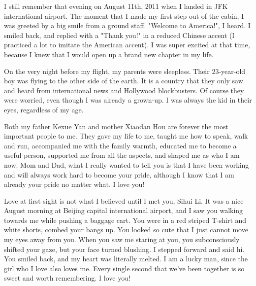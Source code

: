  
I still remember that evening on August 11th, 2011 when I landed in JFK international airport. The moment that I made my first step out of the cabin, I was greeted by a big smile from a ground staff. "Welcome to America!", I heard. I smiled back, and replied with a "Thank you!" in a reduced Chinese accent (I practiced a lot to imitate the American accent). I was super excited at that time, because I knew that I would open up a brand new chapter in my life. 

On the very night before my flight, my parents were sleepless. Their 23-year-old boy was flying to the other side of the earth. It is a country that they only saw and heard from international news and Hollywood blockbusters. Of course they were worried, even though I was already a grown-up. I was always the kid in their eyes, regardless of my age.

Both my father Kexue Yan and mother Xiaodan Hou are forever the most important people to me. They gave my life to me, taught me how to speak, walk and run, accompanied me with the family warmth, educated me to become a useful person, supported me from all the aspects, and shaped me as who I am now. Mom and Dad, what I really wanted to tell you is that I have been working and will always work hard to become your pride, although I know that I am already your pride no matter what. I love you!   

Love at first sight is not what I believed until I met you, Sihui Li. It was a nice August morning at Beijing capital international airport, and I saw you walking towards me while pushing a baggage cart. You were in a red striped T-shirt and white shorts, combed your bangs up. You looked so cute that I just cannot move my eyes away from you. When you saw me staring at you, you subconsciously shifted your gaze, but your face turned blushing. I stepped forward and said hi. You smiled back, and my heart was literally melted.  I am a lucky man, since the girl who I love also loves me. Every single second that we've been together is so sweet and worth remembering. I love you! 

